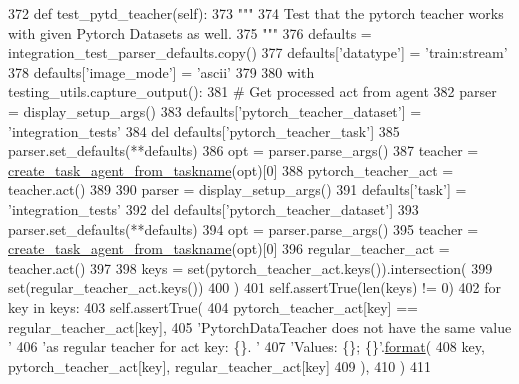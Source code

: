 \begin{DoxyCode}
372     \textcolor{keyword}{def }test\_pytd\_teacher(self):
373         \textcolor{stringliteral}{"""}
374 \textcolor{stringliteral}{        Test that the pytorch teacher works with given Pytorch Datasets as well.}
375 \textcolor{stringliteral}{        """}
376         defaults = integration\_test\_parser\_defaults.copy()
377         defaults[\textcolor{stringliteral}{'datatype'}] = \textcolor{stringliteral}{'train:stream'}
378         defaults[\textcolor{stringliteral}{'image\_mode'}] = \textcolor{stringliteral}{'ascii'}
379 
380         with testing\_utils.capture\_output():
381             \textcolor{comment}{# Get processed act from agent}
382             parser = display\_setup\_args()
383             defaults[\textcolor{stringliteral}{'pytorch\_teacher\_dataset'}] = \textcolor{stringliteral}{'integration\_tests'}
384             del defaults[\textcolor{stringliteral}{'pytorch\_teacher\_task'}]
385             parser.set\_defaults(**defaults)
386             opt = parser.parse\_args()
387             teacher = \hyperlink{namespaceparlai_1_1core_1_1agents_a76269fb567532a8fb7f29edcc20a6e47}{create\_task\_agent\_from\_taskname}(opt)[0]
388             pytorch\_teacher\_act = teacher.act()
389 
390             parser = display\_setup\_args()
391             defaults[\textcolor{stringliteral}{'task'}] = \textcolor{stringliteral}{'integration\_tests'}
392             del defaults[\textcolor{stringliteral}{'pytorch\_teacher\_dataset'}]
393             parser.set\_defaults(**defaults)
394             opt = parser.parse\_args()
395             teacher = \hyperlink{namespaceparlai_1_1core_1_1agents_a76269fb567532a8fb7f29edcc20a6e47}{create\_task\_agent\_from\_taskname}(opt)[0]
396             regular\_teacher\_act = teacher.act()
397 
398         keys = set(pytorch\_teacher\_act.keys()).intersection(
399             set(regular\_teacher\_act.keys())
400         )
401         self.assertTrue(len(keys) != 0)
402         \textcolor{keywordflow}{for} key \textcolor{keywordflow}{in} keys:
403             self.assertTrue(
404                 pytorch\_teacher\_act[key] == regular\_teacher\_act[key],
405                 \textcolor{stringliteral}{'PytorchDataTeacher does not have the same value '}
406                 \textcolor{stringliteral}{'as regular teacher for act key: \{\}. '}
407                 \textcolor{stringliteral}{'Values: \{\}; \{\}'}.\hyperlink{namespaceparlai_1_1chat__service_1_1services_1_1messenger_1_1shared__utils_a32e2e2022b824fbaf80c747160b52a76}{format}(
408                     key, pytorch\_teacher\_act[key], regular\_teacher\_act[key]
409                 ),
410             )
411 
\end{DoxyCode}

